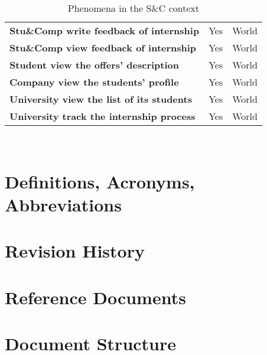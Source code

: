 \begin{table}[H]
\begin{tabular}{|p{20em}|c|c|}
    \textbf{Stu\&Comp write feedback of internship} & Yes & World \T\B\\
    \textbf{Stu\&Comp view feedback of internship} & Yes & World \B\\
    \textbf{Student view the offers' description} & Yes & World \T\B \\
    \textbf{Company view the students' profile} & Yes & World \T\B\\
    \textbf{University view the list of its students} & Yes & World \B\\
    \textbf{University track the internship process} & Yes & World \T\B\\
    \hline
    \end{tabular}
    \\[10pt]
    \caption{Phenomena in the S\&C context}
    \label{table:phenomena}
\end{table}

\section{Definitions, Acronyms, Abbreviations}
\label{sec:definitions}

\section{Revision History}
\label{sec:revision}

\section{Reference Documents}
\label{sec:reference}

\section{Document Structure}
\label{sec:structure}
